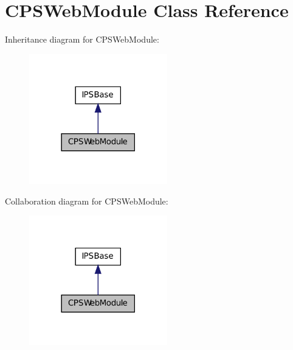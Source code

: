 \hypertarget{classCPSWebModule}{
\section{CPSWebModule Class Reference}
\label{classCPSWebModule}
}


Inheritance diagram for CPSWebModule:\nopagebreak
\begin{figure}[H]
\begin{center}
\leavevmode
\includegraphics[width=170pt]{classCPSWebModule__inherit__graph}
\end{center}
\end{figure}


Collaboration diagram for CPSWebModule:\nopagebreak
\begin{figure}[H]
\begin{center}
\leavevmode
\includegraphics[width=170pt]{classCPSWebModule__coll__graph}
\end{center}
\end{figure}
